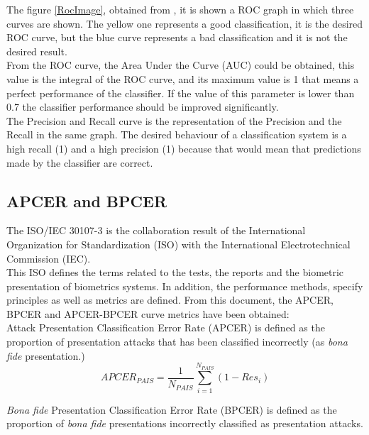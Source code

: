 The figure \ref{RocImage}, obtained from \cite{RocImage}, it is shown a ROC graph in which three curves are shown.  The yellow one represents a good classification, it is the desired ROC curve, but the blue curve represents a bad classification and it is not the desired result.\\

From the ROC curve, the Area Under the Curve (AUC) could be obtained, this value is the integral of the ROC curve, and its maximum value is 1 that means a perfect performance of the classifier. If the value of this parameter is lower than 0.7 the classifier performance should be improved significantly.\\

The Precision and Recall curve is the representation of the Precision and the Recall in the same graph. The desired behaviour of a classification system is a high recall (1) and a high precision (1) because that would mean that predictions made by the classifier are correct.\\

\subsection{APCER and BPCER}
The ISO/IEC 30107-3 \cite{ISO} is the collaboration result of  the International Organization for Standardization (ISO) with the International Electrotechnical Commission (IEC).\\

This ISO defines the terms related to the tests, the reports and the biometric presentation of biometrics systems. In addition, the performance methods, specify principles as well as metrics are defined. From this document, the APCER, BPCER and APCER-BPCER curve metrics have been obtained:\\

Attack Presentation Classification Error Rate (APCER) is defined as the proportion of presentation attacks that has been classified incorrectly (as \textit{bona fide} presentation.)\\

\begin{equation}
  APCER_{PAIS} = \frac{1}{N_{PAIS}}\sum_{i=1}^{N_{PAIS}}(1 - Res_{i})
\end{equation}

\textit{Bona fide} Presentation Classification Error Rate (BPCER) is defined as the proportion of \textit{bona fide} presentations  incorrectly classified as presentation attacks.\\

